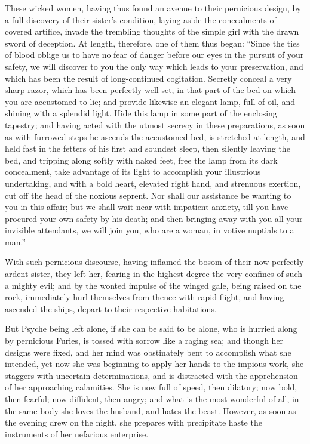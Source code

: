 \documentclass{article}
\begin{document}
These wicked women, having thus found an avenue to their pernicious design, by
a full discovery of their sister's condition, laying aside the concealments of
covered artifice, invade the trembling thoughts of the simple girl with the
drawn sword of deception. At length, therefore, one of them thus began: ``Since
the ties of blood oblige us to have no fear of danger before our eyes in the
pursuit of your safety, we will discover to you the only way which leads to
your preservation, and which has been the result of long-continued cogitation.
Secretly conceal a very sharp razor, which has been perfectly well set, in that
part of the bed on which you are accustomed to lie; and provide likewise an
elegant lamp, full of oil, and shining with a splendid light. Hide this lamp in
some part of the enclosing tapestry; and having acted with the utmost secrecy
in these preparations, as soon as with furrowed steps he ascends the accustomed
bed, is stretched at length, and held fast in the fetters of his first and
soundest sleep, then silently leaving the bed, and tripping along softly with
naked feet, free the lamp from its dark concealment, take advantage of its
light to accomplish your illustrious undertaking, and with a bold heart,
elevated right hand, and strenuous exertion, cut off the head of the noxious
seprent. Nor shall our assistance be wanting to you in this affair; but we
shall wait near with impatient anxiety, till you have procured your own safety
by his death; and then bringing away with you all your invisible attendants, we
will join you, who are a woman, in votive nuptials to a man.''

With such pernicious discourse, having inflamed the bosom of their now
perfectly ardent sister, they left her, fearing in the highest degree the very
confines of such a mighty evil; and by the wonted impulse of the winged gale,
being raised on the rock, immediately hurl themselves from thence with rapid
flight, and having ascended the ships, depart to their respective habitations.

But Psyche being left alone, if she can be said to be alone, who is hurried
along by pernicious Furies, is tossed with sorrow like a raging sea; and though
her designs were fixed, and her mind was obstinately bent to accomplish what
she intended, yet now she was beginning to apply her hands to the impious work,
she staggers with uncertain determinations, and is distracted with the
apprehension of her approaching calamities. She is now full of speed, then
dilatory; now bold, then fearful; now diffident, then angry; and what is the
most wonderful of all, in the same body she loves the husband, and hates the
beast. However, as soon as the evening drew on the night, she prepares with
precipitate haste the instruments of her nefarious enterprise.
\end{document}

